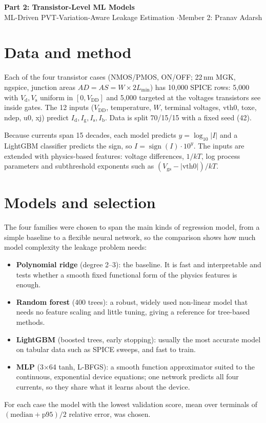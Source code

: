 \documentclass[11pt,a4paper]{article}
\begin{document}
\begin{center}
{\Large\textbf{Part 2: Transistor-Level ML Models}}\\[2pt]
ML-Driven PVT-Variation-Aware Leakage Estimation \quad$\cdot$\quad Member 2: Pranav Adarsh
\end{center}

\section*{Data and method}
Each of the four transistor cases (NMOS/PMOS, ON/OFF; 22\,nm MGK, ngspice, junction areas
$AD=AS=W\times2L_\mathrm{min}$) has 10,000 SPICE rows: 5,000 with $V_\mathrm{d}, V_\mathrm{s}$ uniform
in $[0,V_\mathrm{DD}]$ and 5,000 targeted at the voltages transistors see inside gates. The 12 inputs
($V_\mathrm{DD}$, temperature, $W$, terminal voltages, vth0, toxe, ndep, u0, xj) predict
$I_\mathrm{d}, I_\mathrm{g}, I_\mathrm{s}, I_\mathrm{b}$. Data is split 70/15/15 with a fixed seed (42).

Because currents span 15 decades, each model predicts $y=\log_{10}|I|$ and a LightGBM classifier
predicts the sign, so $I=\operatorname{sign}(I)\cdot10^{y}$. The inputs are extended with
physics-based features: voltage differences, $1/kT$, log process parameters and subthreshold
exponents such as $(V_\mathrm{gs}-|\mathrm{vth0}|)/kT$.

\section*{Models and selection}
The four families were chosen to span the main kinds of regression model, from a simple baseline
to a flexible neural network, so the comparison shows how much model complexity the leakage
problem needs:
\begin{itemize}
  \item \textbf{Polynomial ridge} (degree 2--3): the baseline. It is fast and interpretable and
        tests whether a smooth fixed functional form of the physics features is enough.
  \item \textbf{Random forest} (400 trees): a robust, widely used non-linear model that needs no
        feature scaling and little tuning, giving a reference for tree-based methods.
  \item \textbf{LightGBM} (boosted trees, early stopping): usually the most accurate model on
        tabular data such as SPICE sweeps, and fast to train.
  \item \textbf{MLP} (3$\times$64 tanh, L-BFGS): a smooth function approximator suited to the
        continuous, exponential device equations; one network predicts all four currents, so they
        share what it learns about the device.
\end{itemize}
For each case the model with the lowest validation score, mean over terminals of
$(\text{median}+\text{p95})/2$ relative error, was chosen.
\end{document}
